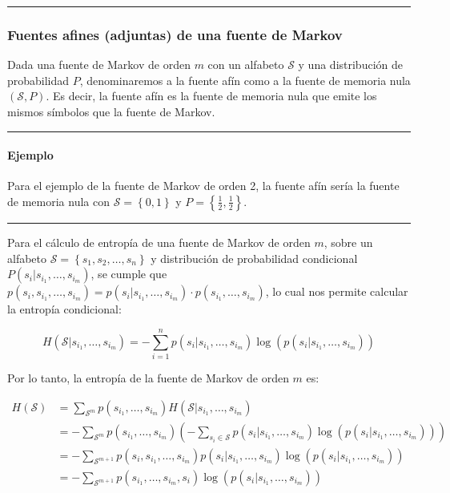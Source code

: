 \begin{center}\rule{0.5\linewidth}{0.5pt}\end{center}

\subsubsection{Fuentes afines (adjuntas) de una fuente de
Markov}\label{fuentes-afines-adjuntas-de-una-fuente-de-markov}

Dada una fuente de Markov de orden \(m\) con un alfabeto \(\mathcal{S}\)
y una distribución de probabilidad \(P\), denominaremos a la fuente afín
como a la fuente de memoria nula \((\mathcal{S},P)\). Es decir, la
fuente afín es la fuente de memoria nula que emite los mismos símbolos
que la fuente de Markov.

\begin{center}\rule{0.5\linewidth}{0.5pt}\end{center}

\paragraph{Ejemplo}\label{ejemplo-2-fuentes-de-informacion}

Para el ejemplo de la fuente de Markov de orden 2, la fuente afín sería
la fuente de memoria nula con \(\mathcal{S}=\left\{0,1\right\}\) y
\(P=\left\{\frac{1}{2},\frac{1}{2}\right\}\).

\begin{center}\rule{0.5\linewidth}{0.5pt}\end{center}

Para el cálculo de entropía de una fuente de Markov de orden \(m\),
sobre un alfabeto \(\mathcal{S}=\left\{s_1,s_2,\dots,s_n\right\}\) y
distribución de probabilidad condicional
\(P(s_i|s_{i_1},\dots,s_{i_m})\), se cumple que
\(p(s_i, s_{i_1},\dots,s_{i_m}) = p(s_i|s_{i_1},\dots,s_{i_m})\cdot p(s_{i_1},\dots,s_{i_m})\),
lo cual nos permite calcular la entropía condicional:

\[
H(\mathcal{S}|s_{i_1},\dots,s_{i_m}) = -\sum_{i=1}^{n}p(s_i|s_{i_1},\dots,s_{i_m})\log\left(p(s_i|s_{i_1},\dots,s_{i_m})\right)
\]

Por lo tanto, la entropía de la fuente de Markov de orden \(m\) es:


\begin{align*}
H(\mathcal{S}) &= \sum_{\mathcal{S}^m}p(s_{i_1},\dots,s_{i_m})H(\mathcal{S}|s_{i_1},\dots,s_{i_m})\\
&= -\sum_{\mathcal{S}^m}p(s_{i_1},\dots,s_{i_m})\left(-\sum_{s_i\in\mathcal{S}}p(s_i|s_{i_1},\dots,s_{i_m})\log\left(p(s_i|s_{i_1},\dots,s_{i_m})\right)\right)\\
&= -\sum_{\mathcal{S}^{m+1}}p(s_i, s_{i_1},\dots,s_{i_m})p(s_i|s_{i_1},\dots,s_{i_m})\log\left(p(s_i|s_{i_1},\dots,s_{i_m})\right)\\
&= -\sum_{\mathcal{S}^{m+1}}p(s_{i_1},\dots,s_{i_m},s_i)\log\left(p(s_i|s_{i_1},\dots,s_{i_m})\right)\\
\end{align*}

